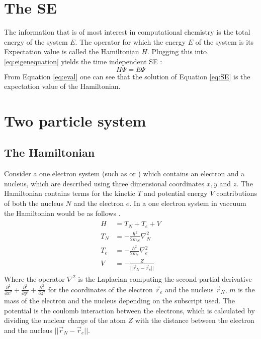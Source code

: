 \documentclass[../master_thesis.tex]{subfiles}
\begin{document}
\section{The \ac{SE}}
The information that is of most interest in computational chemistry is the
total energy of the system $ E $. The operator for which the energy $E$ of the
system is its Expectation value is called the Hamiltonian $H$. Plugging this
into \ref{eq:eigenequation} yields the time independent \ac{SE}
\cite{Cramer:2004, Jensen:2017}:
\begin{equation}
  H\Psi = E\Psi\label{eq:SE}
\end{equation}
From Equation \ref{eq:eval} one can see that the solution of Equation
\ref{eq:SE} is the expectation value of the Hamiltonian.



\section{Two particle system}
\subsection{The Hamiltonian}
Consider a one electron system (such as  or ) which contains an
electron and a nucleus, which are described using three dimensional coordinates
$ x, y $ and $ z $. The Hamiltonian contains terms for the kinetic $T$ and
potential energy $V$ contributions of both the nucleus $ N $ and the electron
$ e $. In a one electron system in vaccuum the Hamiltonian would be as follows
\cite{Jensen:2017, Cramer:2004}.
\begin{align}
  \begin{split}
    H   &= T_N + T_e + V \\
    T_N &= -\frac{\hbar^2}{2m_N}\nabla^2_N \\
    T_e &= -\frac{\hbar^2}{2m_e}\nabla^2_e \\
    V   &= -\frac{Z}{||\vec{r}_N - \vec{r}_e||} \label{eq:twopH}
  \end{split}
\end{align}
Where the operator $ \nabla^2$ is the Laplacian computing the second partial
derivative $ \frac{\partial^2}{\partial x^2} + \frac{\partial^2}{\partial y^2} +
\frac{\partial^2}{\partial z^2} $ for the coordinates of the electron $\vec{r}_e$
and the nucleus $\vec{r}_N$, $ m $ is the mass of the electron and the nucleus
depending on the subscript used. The potential is the coulomb interaction
between the electrons, which is calculated by dividing the nuclear charge of the
atom $ Z $ with the distance between the electron and the nucleus
$ ||\vec{r}_N - \vec{r}_e|| $.
\end{document}
